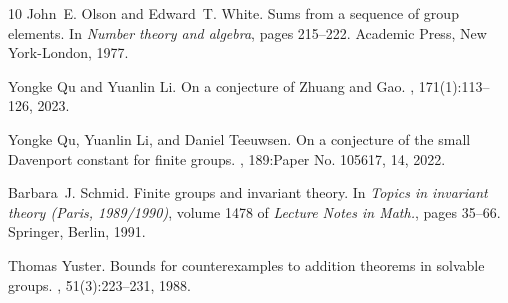 \documentclass[a4paper,11pt]{article}
\numberwithin{equation}{section}
\begin{document}
\begin{thebibliography}{10}
John~E. Olson and Edward~T. White.
\newblock Sums from a sequence of group elements.
\newblock In {\em Number theory and algebra}, pages 215--222. Academic Press, New York-London, 1977.

Yongke Qu and Yuanlin Li.
\newblock On a conjecture of {Z}huang and {G}ao.
, 171(1):113--126, 2023.

Yongke Qu, Yuanlin Li, and Daniel Teeuwsen.
\newblock On a conjecture of the small {D}avenport constant for finite groups.
, 189:Paper No. 105617, 14, 2022.

Barbara~J. Schmid.
\newblock Finite groups and invariant theory.
\newblock In {\em Topics in invariant theory ({P}aris, 1989/1990)}, volume 1478 of {\em Lecture Notes in Math.}, pages 35--66. Springer, Berlin, 1991.

Thomas Yuster.
\newblock Bounds for counterexamples to addition theorems in solvable groups.
, 51(3):223--231, 1988.

\end{thebibliography}
\end{document}
